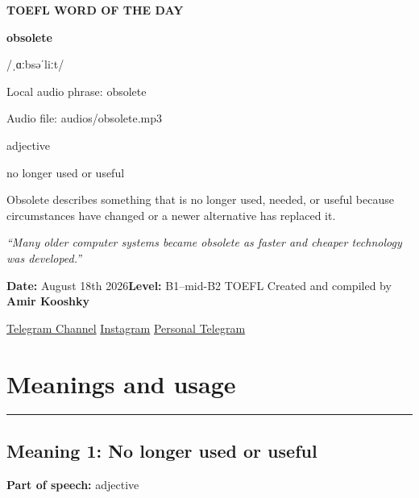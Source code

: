 \documentclass[11pt]{article}
\newcommand{\sectionrule}{\par\vspace{-0.5em}\noindent\textcolor{Accent}{\rule{\linewidth}{0.6pt}}\par}
\begin{document}
\begin{center}
{\sffamily\bfseries\color{Accent} TOEFL WORD OF THE DAY\par}
\vspace{8mm}
{\fontsize{42}{48}\selectfont\bfseries obsolete\par}
\vspace{2mm}
{\Large\sffamily\color{Accent} /ˌɑːbsəˈliːt/\par}
\vspace{2mm}
{\small\sffamily Local audio phrase: obsolete\par}
{\small\sffamily Audio file: audios/obsolete.mp3\par}
\vspace{2mm}
{\large\sffamily\color{Muted} adjective\par}
\vspace{5mm}
{\sffamily no longer used or useful\par}
\vspace{6mm}
{\large Obsolete describes something that is no longer used, needed, or useful because circumstances have changed or a newer alternative has replaced it.\par}
\vspace{6mm}
\begin{minipage}{0.84\textwidth}
\itshape “Many older computer systems became obsolete as faster and cheaper technology was developed.”
\end{minipage}\par
\vspace{10mm}
\textbf{Date:} August 18th 2026\quad\textbullet\quad \textbf{Level:} B1--mid-B2 TOEFL
\vfill
Created and compiled by \textbf{Amir Kooshky}\par
\vspace{2mm}
\href{https://t.me/KooshkyTOEFL}{Telegram Channel}\quad\textbullet\quad
\href{https://www.instagram.com/kooshkytoefl}{Instagram}\quad\textbullet\quad
\href{https://t.me/KooshkyTOEFL\_pv}{Personal Telegram}
\end{center}
\newpage
\tableofcontents
\newpage

\section{Meanings and usage}
\sectionrule
\subsection{Meaning 1: No longer used or useful}
\textbf{Part of speech:} adjective
\end{document}
